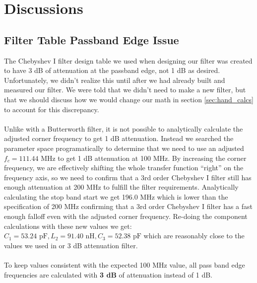 \documentclass[letterpaper,12pt]{article}
\begin{document}
\newpage
\section{Discussions \label{sec:discussion}}
\subsection{Filter Table Passband Edge Issue}
The Chebyshev I filter design table we used when designing our filter was created to have 3 dB of attenuation at the passband edge, not 1 dB as desired. Unfortunately, we didn't realize this until after we had already built and measured our filter. We were told that we didn't need to make a new filter, but that we should discuss how we would change our math in section \ref{sec:hand_calcs} to account for this discrepancy.
\\
\\
Unlike with a Butterworth filter, it is not possible to analytically calculate the adjusted corner frequency to get 1 dB attenuation. Instead we searched the parameter space programatically to determine that we need to use an adjusted $f_c = 111.44 \text{ MHz}$ to get 1 dB attenuation at 100 MHz. 
By increasing the corner frequency, we are effectively shifting the whole transfer function ``right'' on the frequency axis, so we need to confirm that a 3rd order Chebyshev I filter still has enough attenuation at 200 MHz to fulfill the filter requirements. Analytically calculating the stop band start we get 196.0 MHz which is lower than the specification of 200 MHz confirming that a 3rd order Chebyshev I filter has a fast enough falloff even with the adjusted corner frequency. Re-doing the component calculations with these new values we get: $C_1 = 53.24 \text{ pF}, L_2 = 91.40 \text{ nH}, C_3 = 52.38 \text{ pF}$ which are reasonably close to the values we used in or 3 dB attenuation filter. \\
\\
To keep values consistent with the expected 100 MHz value, all pass band edge frequencies are calculated with \textbf{3 dB} of attenuation instead of 1 dB.
\end{document}
